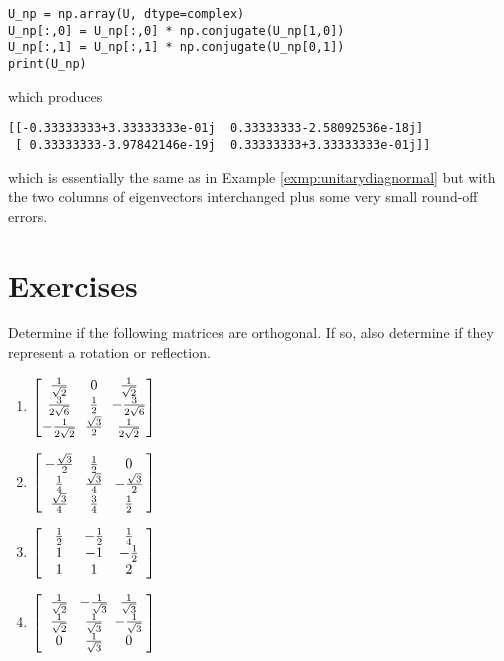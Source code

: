 \begin{lstlisting}
U_np = np.array(U, dtype=complex)
U_np[:,0] = U_np[:,0] * np.conjugate(U_np[1,0])
U_np[:,1] = U_np[:,1] * np.conjugate(U_np[0,1])
print(U_np)    
\end{lstlisting}
which produces
\begin{lstlisting}
[[-0.33333333+3.33333333e-01j  0.33333333-2.58092536e-18j]
 [ 0.33333333-3.97842146e-19j  0.33333333+3.33333333e-01j]]    
\end{lstlisting}
which is essentially the same as in Example \ref{exmp:unitarydiagnormal} but with the two columns of eigenvectors interchanged plus some very small round-off errors.

\section{Exercises}

\begin{Exercise}
Determine if the following matrices are orthogonal. If so, also determine if they represent a rotation or reflection.
\begin{enumerate}[label=(\alph*)]
\item $\left[\begin{array}{wc{15pt}wc{15pt}wc{15pt}}
\frac{1}{\sqrt{2}} & 0 & \frac{1}{\sqrt{2}}\\
\frac{3}{2\sqrt{6}} & \frac{1}{2} & -\frac{3}{2\sqrt{6}}\\
-\frac{1}{2\sqrt{2}} & \frac{\sqrt{3}}{2} & \frac{1}{2\sqrt{2}}
\end{array}\right]$
\item $\left[\begin{array}{wc{15pt}wc{15pt}wc{15pt}}
-\frac{\sqrt{3}}{2} & \frac{1}{2} & 0\\
\frac{1}{4} & \frac{\sqrt{3}}{4} & -\frac{\sqrt{3}}{2}\\
\frac{\sqrt{3}}{4} & \frac{3}{4} & \frac{1}{2}
\end{array}\right]$
\item $\left[\begin{array}{wc{15pt}wc{15pt}wc{15pt}}
\frac{1}{2}&-\frac{1}{2}&\frac{1}{4}\\
1&-1&-\frac{1}{2}\\ 
1&1&2 \end{array}\right]$
\item $\left[\begin{array}{wc{15pt}wc{15pt}wc{15pt}}
\frac{1}{\sqrt{2}} & -\frac{1}{\sqrt{3}} & \frac{1}{\sqrt{3}}\\
\frac{1}{\sqrt{2}} & \frac{1}{\sqrt{3}} & -\frac{1}{\sqrt{3}}\\
0 & \frac{1}{\sqrt{3}} & 0
\end{array}\right]$
\end{enumerate}
\end{Exercise}


